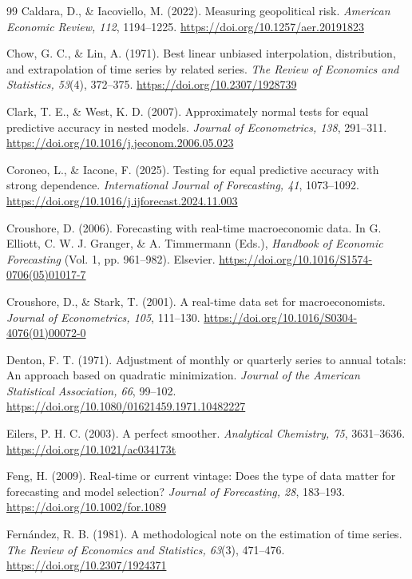 \documentclass[preprint,12pt,authoryear]{elsarticle}
\begin{document}
\begin{thebibliography}{99}
Caldara, D., \& Iacoviello, M. (2022). Measuring geopolitical risk.
\emph{American Economic Review, 112}, 1194--1225.
\url{https://doi.org/10.1257/aer.20191823}

Chow, G. C., \& Lin, A. (1971). Best linear unbiased interpolation, distribution, and extrapolation of time series by related series.
\emph{The Review of Economics and Statistics, 53}(4), 372--375.
\url{https://doi.org/10.2307/1928739}

Clark, T. E., \& West, K. D. (2007). Approximately normal tests for equal
predictive accuracy in nested models. \emph{Journal of Econometrics, 138},
291--311. \url{https://doi.org/10.1016/j.jeconom.2006.05.023}

Coroneo, L., \& Iacone, F. (2025). Testing for equal predictive accuracy with
strong dependence. \emph{International Journal of Forecasting, 41},
1073--1092. \url{https://doi.org/10.1016/j.ijforecast.2024.11.003}

Croushore, D. (2006). Forecasting with real-time macroeconomic data. In
G. Elliott, C. W. J. Granger, \& A. Timmermann (Eds.), \emph{Handbook of
Economic Forecasting} (Vol. 1, pp. 961--982). Elsevier.
\url{https://doi.org/10.1016/S1574-0706(05)01017-7}

Croushore, D., \& Stark, T. (2001). A real-time data set for macroeconomists.
\emph{Journal of Econometrics, 105}, 111--130.
\url{https://doi.org/10.1016/S0304-4076(01)00072-0}

Denton, F. T. (1971). Adjustment of monthly or quarterly series to annual
totals: An approach based on quadratic minimization. \emph{Journal of the
American Statistical Association, 66}, 99--102.
\url{https://doi.org/10.1080/01621459.1971.10482227}

Eilers, P. H. C. (2003). A perfect smoother. \emph{Analytical Chemistry, 75},
3631--3636. \url{https://doi.org/10.1021/ac034173t}

Feng, H. (2009). Real-time or current vintage: Does the type of data matter for
forecasting and model selection? \emph{Journal of Forecasting, 28}, 183--193.
\url{https://doi.org/10.1002/for.1089}

Fern\'{a}ndez, R. B. (1981). A methodological note on the estimation of time series.
\emph{The Review of Economics and Statistics, 63}(3), 471--476.
\url{https://doi.org/10.2307/1924371}


\end{thebibliography}
\end{document}
